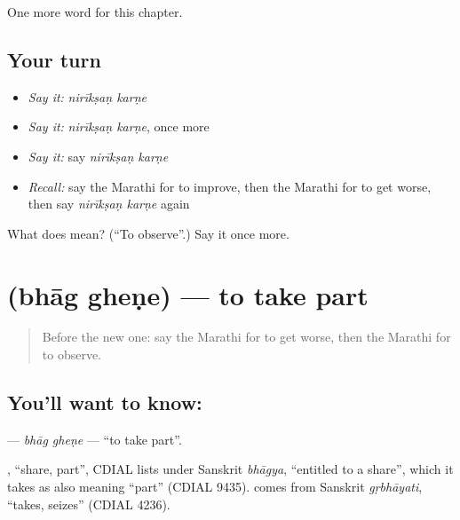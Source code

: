 \begin{grammarlens}[title={What you've built}]
One more word for this chapter.
\end{grammarlens}

\subsection*{Your turn}
\begin{itemize}
\raggedright
  \item \emph{Say it:} \emph{nirīkṣaṇ karṇe}
  \item \emph{Say it:} \emph{nirīkṣaṇ karṇe}, once more
  \item \emph{Say it:} say \emph{nirīkṣaṇ karṇe}
  \item \emph{Recall:} say the Marathi for to improve, then the Marathi for to get worse, then say \emph{nirīkṣaṇ karṇe} again
\end{itemize}

\begin{tcolorbox}[breakable,colback=teal!4,colframe=teal!35!black,title={Before you move on}]
What does   mean? (\textquotedblleft{}To observe\textquotedblright{}.) Say it once more.
\end{tcolorbox}
\section[\texorpdfstring{\mr{भाग} \mr{घेणे} (bhāg gheṇe)}{भाग घेणे (bhāg gheṇe)}]{  (bhāg gheṇe) — to take part}

\label{lesson:MR-C165-bhag-ghene}



\begin{quote}
Before the new one: say the Marathi for to get worse, then the Marathi for to observe.
\end{quote}

\subsection*{You'll want to know:  }
\textbf{ } — \emph{bhāg gheṇe} — \textquotedblleft{}to take part\textquotedblright{}.

\begin{cousinweb}
\textbf{}, \textquotedblleft{}share, part\textquotedblright{}, CDIAL lists under Sanskrit \emph{bhāgya}, \textquotedblleft{}entitled to a share\textquotedblright{}, which it takes as also meaning \textquotedblleft{}part\textquotedblright{} (CDIAL 9435). \textbf{} comes from Sanskrit \emph{gṛbhāyati}, \textquotedblleft{}takes, seizes\textquotedblright{} (CDIAL 4236).
\end{cousinweb}

